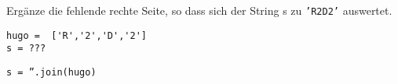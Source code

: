 \question[1]
Ergänze die fehlende rechte Seite, so dass sich der String s zu
\texttt{'R2D2'} auswertet.

\begin{lstlisting}
hugo =  ['R','2','D','2']
s = ???
\end{lstlisting}
\begin{solutionbox}{1cm}
\texttt{s = ''.join(hugo)}
\end{solutionbox}
